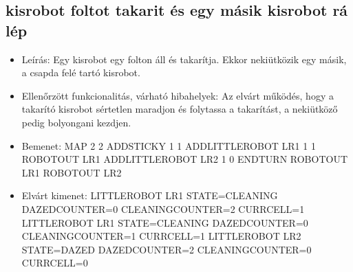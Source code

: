 \subsection{kisrobot foltot takarit és egy másik kisrobot rá lép}
\begin{itemize}
	\item Leírás: \newline
	Egy kisrobot egy folton áll és takarítja. Ekkor nekiütközik egy másik, a csapda felé tartó kisrobot.
	\item Ellenőrzött funkcionalitás, várható hibahelyek: \newline
	Az elvárt működés, hogy a takarító kisrobot sértetlen maradjon és folytassa a takarítást, a nekiütköző pedig bolyongani kezdjen.
	
	\item Bemenet: \newline
	MAP 2 2 \newline
	ADDSTICKY 1 1 \newline
	ADDLITTLEROBOT LR1 1 1 \newline
	ROBOTOUT LR1 \newline
	ADDLITTLEROBOT LR2 1 0 \newline
	ENDTURN \newline
	ROBOTOUT LR1 \newline
	ROBOTOUT LR2 \newline
	
	\item Elvárt kimenet: \newline
	LITTLEROBOT LR1 STATE=CLEANING DAZEDCOUNTER=0 CLEANINGCOUNTER=2 CURRCELL=1 \newline
	LITTLEROBOT LR1 STATE=CLEANING DAZEDCOUNTER=0 CLEANINGCOUNTER=1 CURRCELL=1 \newline
	LITTLEROBOT LR2 STATE=DAZED DAZEDCOUNTER=2 CLEANINGCOUNTER=0 CURRCELL=0 \newline

	
\end{itemize}

